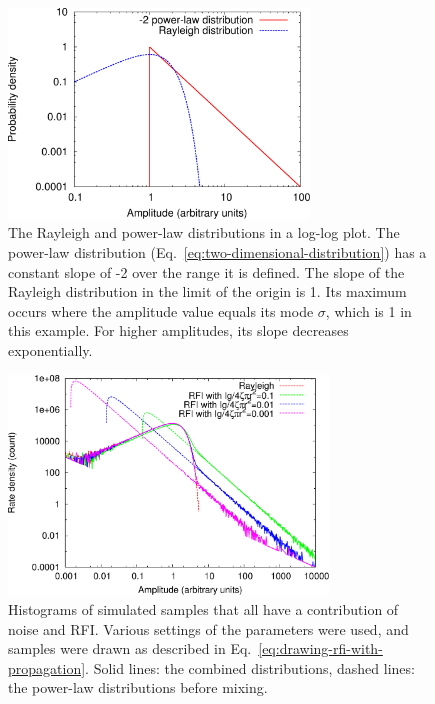 \documentclass[useAMS,usenatbib]{mn2e}
\begin{document}
\begin{figure}
\begin{center}\hspace{-5mm}\includegraphics[width=8cm]{img/plot-rayleigh-and-rfi-trimmed}
\caption{The Rayleigh and power-law distributions in a log-log plot. The power-law distribution (Eq.~\eqref{eq:two-dimensional-distribution}) has a constant slope of -2 over the range it is defined. The slope of the Rayleigh distribution in the limit of the origin is 1. Its maximum occurs where the amplitude value equals its mode $\sigma$, which is 1 in this example. For higher amplitudes, its slope decreases exponentially.}
\label{fig:rayleigh-and-rfi-distributions}
\end{center}
\end{figure}

\begin{figure}
\begin{center}\hspace{-2mm}\includegraphics[width=8.5cm]{img/plot-rayleigh-and-rfi-combined-trimmed}
\caption{Histograms of simulated samples that all have a contribution of noise and RFI. Various settings of the parameters were used, and samples were drawn as described in Eq.~\eqref{eq:drawing-rfi-with-propagation}. Solid lines: the combined distributions, dashed lines: the power-law distributions before mixing. }
\label{fig:rayleigh-and-rfi-combined}
\end{center}
\end{figure}
\end{document}
